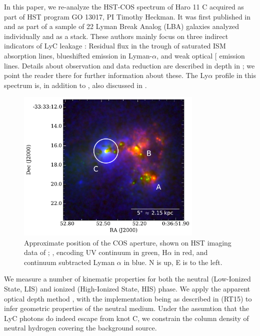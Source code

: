 \documentclass[twocolumn,]{aastex61}
\begin{document}
In this paper, we re-analyze the HST-COS spectrum of Haro 11 C acquired
as part of HST program GO 13017, PI Timothy Heckman. It was first
published in \citet{Alexandroff2015} and \citet{Heckman2015} as part of
a sample of 22 Lyman Break Analog (LBA) galaxies analyzed individually
and as a stack. These authors mainly focus on three indirect indicators
of LyC leakage \citep{Overzier2009, Heckman2011}: Residual flux in the
trough of saturated ISM absorption lines, blueshifted emission in
Lyman-$\alpha$, and weak optical {[}\ion{S}{2}{]} emission lines.
Details about observation and data reduction are described in depth in
\citet{Alexandroff2015}; we point the reader there for further
information about these. The Ly$\alpha$ profile in this spectrum is, in
addition to \citet{Heckman2011}, also discussed in \citet{Verhamme2015}.

\begin{figure}
\centering
\includegraphics[width=3.500in]{./Haroslit.pdf}
\caption{Approximate position of the COS aperture, shown on HST imaging
data of \citet{Hayes2009}; \citet{Ostlin2009}, encoding UV continuum in
green, H$\alpha$ in red, and continuum subtracted Lyman $\alpha$ in
blue. N is up, E is to the left.}\label{fig:apert}
\end{figure}

We measure a number of kinematic properties for both the neutral (Low-Ionized
State, LIS) and ionized (High-Ionized State, HIS) phase. We apply the apparent
optical depth method \citep[AOD, ][]{Savage1991, Pettini2002, Quider2009,
Jones2013}, with the implementation being as described in
\citet{RiveraThorsen2015} (RT15) to infer geometric properties of the neutral
medium. Under the assumtion that the LyC photons do indeed escape from knot C,
we constrain the column density of neutral hydrogen covering the background
source.  
\end{document}
